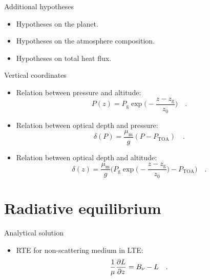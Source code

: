 \documentclass[aspectratio=43]{beamer}
\newcommand{\PTOA}{P_\text{TOA}}
\begin{document}
\begin{frame}{Additional hypotheses}
  \begin{itemize}
    \item<1-> Hypotheses on the planet.
    \item<2-> Hypotheses on the atmosphere composition.
    \item<3-> Hypotheses on total heat flux.
  \end{itemize}
\end{frame}

\begin{frame}{Vertical coordinates}
  \begin{itemize}
    \item Relation between pressure and altitude:
      \begin{equation}
        \label{eq:pressure_altitude}
        P(z) = P_\text{g} \exp{\bigg( - \frac{z - z_\text{g}}{z_0} \bigg)}
        \quad .
      \end{equation}
    \item Relation between optical depth and pressure:
      \begin{equation}
        \label{eq:optical_depth_pressure}
        \delta(P) = \frac{\mu_\text{m}}{g} (P - \PTOA)
        \quad .
      \end{equation}
    \item Relation between optical depth and altitude:
      \begin{equation}
        \label{eq:optical_depth_altitude_2}
        \delta(z) = \frac{\mu_\text{m}}{g} \bigg( P_\text{g} \exp{\bigg( - \frac{z - z_\text{g}}{z_0} \bigg)} - \PTOA \bigg)
        \quad .
      \end{equation}
  \end{itemize}
\end{frame}



\section{Radiative equilibrium}
\begin{frame}{Analytical solution}
  \begin{itemize}
    \item RTE for non-scattering medium in LTE:
      \begin{equation}
        \label{eq:RTE_analytical}
        \frac{1}{\mu} \pdv{L}{z} = B_\nu - L
        \quad .
      \end{equation}
  \end{itemize}
\end{frame}
\end{document}

